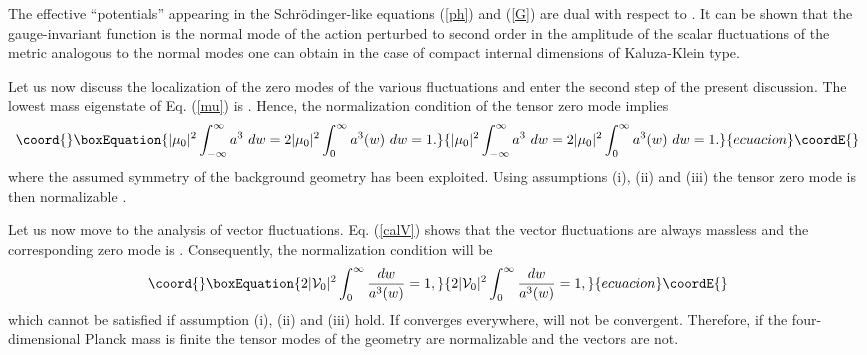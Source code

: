 \documentclass[a4paper,12pt]{article}
\begin{document}
The effective ``potentials'' appearing 
in the Schr\"odinger-like equations (\ref{ph}) and (\ref{G}) are dual 
with respect to \coordHE{}. It can be shown that the 
 gauge-invariant function \coordHE{}  is the normal mode of the  
action perturbed to second order 
in the amplitude of the scalar fluctuations of the metric analogous 
to the normal modes one can obtain in the case of compact internal 
dimensions \cite{mg} of Kaluza-Klein type.

Let us now discuss the localization of the zero modes of the various 
fluctuations and enter the second step of the present discussion.
The lowest mass eigenstate of Eq. (\ref{mu}) 
is  \coordHE{}. Hence, the normalization 
condition of the tensor zero mode implies 
\begin{equation}\coord{}\boxEquation{
|\mu_0|^2 \int_{-\infty}^{\infty} a^3 ~dw = 2 |\mu_0|^2\int_{0}^{\infty}a^3(w)
~ dw=1 .
}{
|\mu_0|^2 \int_{-\infty}^{\infty} a^3 ~dw = 2 |\mu_0|^2\int_{0}^{\infty}a^3(w)
~ dw=1 .
}{ecuacion}\coordE{}\end{equation} 
where the assumed \coordHE{} symmetry of the background geometry 
has been exploited. Using assumptions (i), (ii) and (iii) the tensor 
zero mode is then normalizable \cite{rusu1,rusu2}. 

Let us now move to the analysis of vector fluctuations.
 Eq. (\ref{calV}) shows that the vector fluctuations are 
always massless and the corresponding zero mode is \coordHE{}. Consequently, the normalization 
condition will be 
\begin{equation}\coord{}\boxEquation{
2 |{\cal V}_0|^2 \int_{0}^{\infty} \frac{d w}{a^3(w)} =1,
}{
2 |{\cal V}_0|^2 \int_{0}^{\infty} \frac{d w}{a^3(w)} =1,
}{ecuacion}\coordE{}\end{equation}
which cannot be satisfied if assumption (i), (ii) and (iii) hold. If \coordHE{} 
converges everywhere, \coordHE{} will not be convergent.
Therefore, if the four-dimensional Planck mass 
is finite the tensor modes of the geometry are normalizable and the vectors 
are not.
\end{document}
